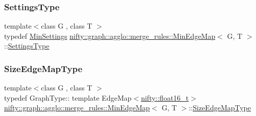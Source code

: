 \mbox{\label{classnifty_1_1graph_1_1agglo_1_1merge__rules_1_1MinEdgeMap_ad0dd446b81440917b4dd852bd6bf1dac}} 
\subsubsection{\texorpdfstring{Settings\+Type}{SettingsType}}
{\footnotesize\ttfamily template$<$class G , class T $>$ \\
typedef \hyperlink{structnifty_1_1graph_1_1agglo_1_1merge__rules_1_1MinSettings}{Min\+Settings} \hyperlink{classnifty_1_1graph_1_1agglo_1_1merge__rules_1_1MinEdgeMap}{nifty\+::graph\+::agglo\+::merge\+\_\+rules\+::\+Min\+Edge\+Map}$<$ G, T $>$\+::\hyperlink{classnifty_1_1graph_1_1agglo_1_1merge__rules_1_1MinEdgeMap_ad0dd446b81440917b4dd852bd6bf1dac}{Settings\+Type}}

\mbox{\label{classnifty_1_1graph_1_1agglo_1_1merge__rules_1_1MinEdgeMap_ae785a9cf684a3c819ab624171d364a96}} 
\subsubsection{\texorpdfstring{Size\+Edge\+Map\+Type}{SizeEdgeMapType}}
{\footnotesize\ttfamily template$<$class G , class T $>$ \\
typedef Graph\+Type\+:: template Edge\+Map$<$\hyperlink{namespacenifty_a20031b62bd5c16b943905d43a8ed361a}{nifty\+::float16\+\_\+t}$>$ \hyperlink{classnifty_1_1graph_1_1agglo_1_1merge__rules_1_1MinEdgeMap}{nifty\+::graph\+::agglo\+::merge\+\_\+rules\+::\+Min\+Edge\+Map}$<$ G, T $>$\+::\hyperlink{classnifty_1_1graph_1_1agglo_1_1merge__rules_1_1MinEdgeMap_ae785a9cf684a3c819ab624171d364a96}{Size\+Edge\+Map\+Type}}



